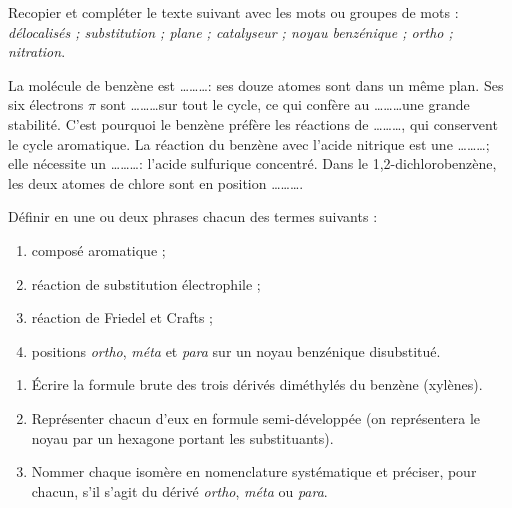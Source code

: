 \documentclass[11pt]{article}
\newcounter{popsec}
\newcounter{popsub}
\newcommand{\courssub}[1]{%
  \stepcounter{popsub}%
  \par\vspace{9pt}\noindent{\popxbold\fontsize{11.5}{13}\selectfont\color{popink}{\color{poporange}\thepopsec.\thepopsub}\hspace{6pt}#1}\par\nopagebreak\vspace{4pt}
}
\begin{document}
\begin{exercice}
Recopier et compléter le texte suivant avec les mots ou groupes de mots : \emph{délocalisés ; substitution ; plane ; catalyseur ; noyau benzénique ; ortho ; nitration}.

La molécule de benzène est \ldots\ldots\ldots : ses douze atomes sont dans un même plan. Ses six électrons $\pi$ sont \ldots\ldots\ldots sur tout le cycle, ce qui confère au \ldots\ldots\ldots une grande stabilité. C'est pourquoi le benzène préfère les réactions de \ldots\ldots\ldots, qui conservent le cycle aromatique. La réaction du benzène avec l'acide nitrique est une \ldots\ldots\ldots ; elle nécessite un \ldots\ldots\ldots : l'acide sulfurique concentré. Dans le 1,2-dichlorobenzène, les deux atomes de chlore sont en position \ldots\ldots\ldots .
\end{exercice}

\begin{exercice}[Définitions]
Définir en une ou deux phrases chacun des termes suivants :
\begin{enumerate}
\item composé aromatique ;
\item réaction de substitution électrophile ;
\item réaction de Friedel et Crafts ;
\item positions \emph{ortho}, \emph{méta} et \emph{para} sur un noyau benzénique disubstitué.
\end{enumerate}
\end{exercice}

\courssub{Je m'entraîne}

\begin{exercice}
\begin{enumerate}
\item Écrire la formule brute des trois dérivés diméthylés du benzène (xylènes).
\item Représenter chacun d'eux en formule semi-développée (on représentera le noyau par un hexagone portant les substituants).
\item Nommer chaque isomère en nomenclature systématique et préciser, pour chacun, s'il s'agit du dérivé \emph{ortho}, \emph{méta} ou \emph{para}.
\end{enumerate}
\end{exercice}
\end{document}

